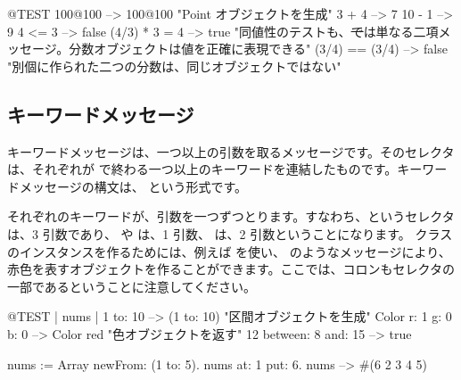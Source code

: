 \documentclass[a4paper,10pt,twoside]{book}
\begin{document}
\begin{code}{@TEST}
100@100      --> 100@100  "Point オブジェクトを生成"
3 + 4              --> 7
10 - 1            --> 9
4 <= 3            --> false
(4/3) * 3 = 4   --> true  "同値性のテストも、\st では単なる二項メッセージ。分数オブジェクトは値を正確に表現できる"
(3/4) == (3/4) --> false  "別個に作られた二つの分数は、同じオブジェクトではない"
\end{code}


\subsection{キーワードメッセージ}

キーワードメッセージは、一つ以上の引数を取るメッセージです。そのセレクタは、それぞれが \ct{:} で終わる一つ以上のキーワードを連結したものです。キーワードメッセージの構文は、
という形式です。

それぞれのキーワードが、引数を一つずつとります。すなわち、というセレクタは、3 引数であり、 や  は、1 引数、 は、2 引数ということになります。 クラスのインスタンスを作るためには、例えば  を使い、 のようなメッセージにより、赤色を表すオブジェクトを作ることができます。ここでは、コロンもセレクタの一部であるということに注意してください。


\begin{code}{@TEST | nums |}
1 to: 10                        --> (1 to: 10)  "区間オブジェクトを生成"
Color r: 1 g: 0 b: 0       --> Color red  "色オブジェクトを返す"
12 between: 8 and: 15 --> true

nums := Array newFrom: (1 to: 5).
nums at: 1 put: 6.
nums --> #(6 2 3 4 5)
\end{code}
\end{document}
